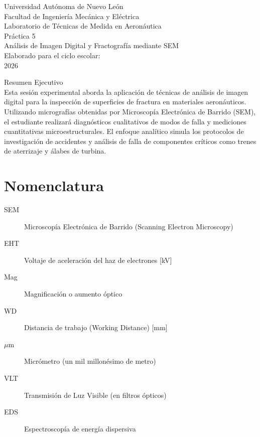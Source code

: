 \documentclass[11pt, a4paper]{article}
\begin{document}
\begin{titlepage}
    \centering
    {\LARGE Universidad Autónoma de Nuevo León}\\[0.5cm]
    {\Large Facultad de Ingeniería Mecánica y Eléctrica}\\[2cm]
    
    {\Large Laboratorio de Técnicas de Medida en Aeronáutica}\\[1cm]
    
    {\Huge Práctica 5}\\[0.5cm]
    {\Large Análisis de Imagen Digital y Fractografía mediante SEM}\\[2cm]
    
    Elaborado para el ciclo escolar:\\
    2026\\[2cm]
    
    \vfill
    
    Resumen Ejecutivo\\
    Esta sesión experimental aborda la aplicación de técnicas de análisis de imagen digital para la inspección de superficies de fractura en materiales aeronáuticos. Utilizando micrografías obtenidas por Microscopía Electrónica de Barrido (SEM), el estudiante realizará diagnósticos cualitativos de modos de falla y mediciones cuantitativas microestructurales. El enfoque analítico simula los protocolos de investigación de accidentes y análisis de falla de componentes críticos como trenes de aterrizaje y álabes de turbina.
\end{titlepage}

\tableofcontents
\newpage

\section*{Nomenclatura}
\begin{description}
    \item[SEM] Microscopía Electrónica de Barrido (Scanning Electron Microscopy)
    \item[EHT] Voltaje de aceleración del haz de electrones [kV]
    \item[Mag] Magnificación o aumento óptico
    \item[WD] Distancia de trabajo (Working Distance) [mm]
    \item[$\mu$m] Micrómetro (un mil millonésimo de metro)
    \item[VLT] Transmisión de Luz Visible (en filtros ópticos)
    \item[EDS] Espectroscopía de energía dispersiva
\end{description}
\end{document}
